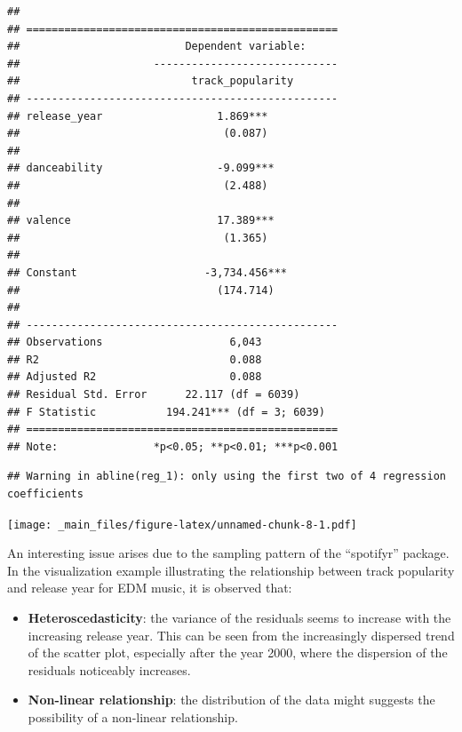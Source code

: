 \documentclass[
]{book}
\newenvironment{Shaded}{\begin{snugshade}}{\end{snugshade}}
\newcommand{\FunctionTok}[1]{\textcolor[rgb]{0.13,0.29,0.53}{\textbf{#1}}}
\newcommand{\NormalTok}[1]{#1}
\newcommand{\SpecialCharTok}[1]{\textcolor[rgb]{0.81,0.36,0.00}{\textbf{#1}}}
\begin{document}
\begin{verbatim}
## 
## =================================================
##                          Dependent variable:     
##                     -----------------------------
##                           track_popularity       
## -------------------------------------------------
## release_year                  1.869***           
##                                (0.087)           
##                                                  
## danceability                  -9.099***          
##                                (2.488)           
##                                                  
## valence                       17.389***          
##                                (1.365)           
##                                                  
## Constant                    -3,734.456***        
##                               (174.714)          
##                                                  
## -------------------------------------------------
## Observations                    6,043            
## R2                              0.088            
## Adjusted R2                     0.088            
## Residual Std. Error      22.117 (df = 6039)      
## F Statistic           194.241*** (df = 3; 6039)  
## =================================================
## Note:               *p<0.05; **p<0.01; ***p<0.001
\end{verbatim}

\begin{Shaded}
\end{Shaded}

\begin{verbatim}
## Warning in abline(reg_1): only using the first two of 4 regression coefficients
\end{verbatim}

\texttt{[image: \_main\_files/figure-latex/unnamed-chunk-8-1.pdf]}

An interesting issue arises due to the sampling pattern of the ``spotifyr'' package. In the visualization example illustrating the relationship between track popularity and release year for EDM music, it is observed that:

\begin{itemize}
\item
  \textbf{Heteroscedasticity}: the variance of the residuals seems to increase with the increasing release year. This can be seen from the increasingly dispersed trend of the scatter plot, especially after the year 2000, where the dispersion of the residuals noticeably increases.
\item
  \textbf{Non-linear relationship}: the distribution of the data might suggests the possibility of a non-linear relationship.
\end{itemize}
\end{document}
